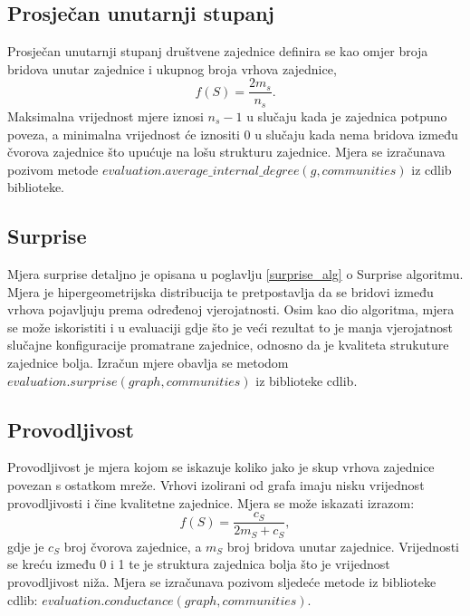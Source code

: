 \documentclass[times, utf8, diplomski]{fer}
\begin{document}


\pagebreak
\subsection{Prosječan unutarnji stupanj}
Prosječan unutarnji stupanj društvene zajednice definira se kao omjer broja bridova unutar zajednice i ukupnog broja vrhova zajednice,
\begin{equation}
	f(S) =  \frac{2m_{s}}{n_{s}}.
\end{equation}
Maksimalna vrijednost mjere iznosi $n_{s} - 1$ u slučaju kada je zajednica potpuno poveza, a minimalna vrijednost će iznositi 0 u slučaju kada nema bridova između čvorova zajednice što upućuje na lošu strukturu zajednice. Mjera se izračunava pozivom metode $evaluation.average\_internal\_degree(g,communities)$ iz cdlib biblioteke.


\subsection{Surprise}
Mjera surprise detaljno je opisana u poglavlju \ref{surprise_alg} o Surprise algoritmu. Mjera je hipergeometrijska distribucija te pretpostavlja da se bridovi između vrhova pojavljuju prema određenoj vjerojatnosti. Osim kao dio algoritma, mjera se može iskoristiti i u evaluaciji gdje što je veći rezultat to je manja vjerojatnost slučajne konfiguracije promatrane zajednice, odnosno da je kvaliteta strukuture zajednice bolja. Izračun mjere obavlja se metodom $evaluation.surprise(graph, communities)$ iz biblioteke cdlib.


\subsection{Provodljivost}
Provodljivost je mjera kojom se iskazuje koliko jako je skup vrhova zajednice povezan s ostatkom mreže. Vrhovi izolirani od grafa imaju nisku vrijednost provodljivosti i čine kvalitetne zajednice. Mjera se može iskazati izrazom:
\begin{equation}
	f(S) = \frac{c_{S}}{2m_{S} + c_{S}},
\end{equation}
gdje je $c_{S}$ broj čvorova zajednice, a $m_{S}$ broj bridova unutar zajednice. Vrijednosti se kreću između 0 i 1 te je struktura zajednica bolja što je vrijednost provodljivost niža. Mjera se izračunava pozivom sljedeće metode iz biblioteke cdlib: $evaluation.conductance(graph, communities)$.
\end{document}
